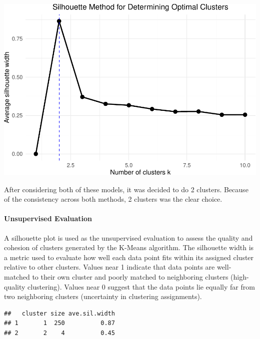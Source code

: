 \documentclass[
]{article}
\begin{document}
\vspace{10pt}

\includegraphics{Final-Report_files/figure-latex/k-means optimal cluster silhouette-1.pdf}


\vspace{10pt}

After considering both of these models, it was decided to do 2 clusters.
Because of the consistency across both methods, 2 clusters was the clear
choice.

\paragraph{Unsupervised Evaluation}\label{unsupervised-evaluation}

A silhouette plot is used as the unsupervised evaluation to assess the
quality and cohesion of clusters generated by the K-Means algorithm. The
silhouette width is a metric used to evaluate how well each data point
fits within its assigned cluster relative to other clusters. Values near
1 indicate that data points are well-matched to their own cluster and
poorly matched to neighboring clusters (high-quality clustering). Values
near 0 suggest that the data points lie equally far from two neighboring
clusters (uncertainty in clustering assignments).

\vspace{10pt}

\begin{verbatim}
##   cluster size ave.sil.width
## 1       1  250          0.87
## 2       2    4          0.45
\end{verbatim}
\end{document}
